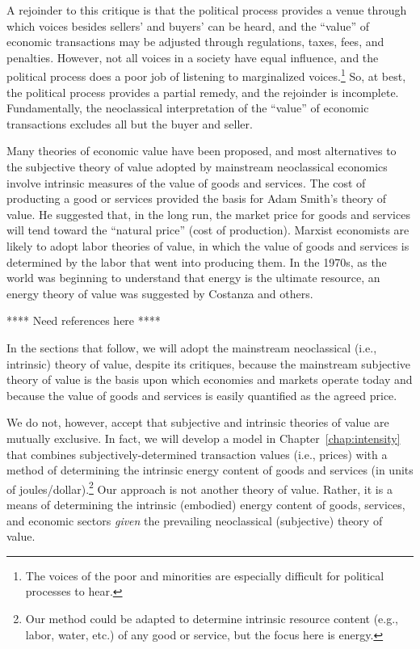 A rejoinder to this critique is that the political process
provides a venue through which voices
besides sellers' and buyers' can be heard, 
and the ``value'' of economic transactions may be 
adjusted through regulations, taxes, fees, and penalties.
However, not all voices in a society have equal influence,
and the political process does a poor job of listening to 
marginalized voices.\footnote{The voices
of the poor and minorities are especially difficult for 
political processes to hear.}
So, at best, the political process provides a partial remedy,
and the rejoinder is incomplete.
Fundamentally, the neoclassical interpretation of the ``value''
of economic transactions excludes all but the buyer and seller.

Many theories of economic value have been proposed, 
and most alternatives to the subjective theory of value
adopted by mainstream neoclassical economics involve 
intrinsic measures of the value of goods and services.
The cost of producting a good or services provided the basis for
Adam Smith's theory of value. He suggested that, in the long run,
the market price for goods and services will tend toward
the ``natural price'' (cost of production).
Marxist economists are likely to adopt labor theories of value, 
in which the value of goods and services is 
determined by the labor that went into producing them.
In the 1970s, as the world was beginning to understand that 
energy is the ultimate resource, 
an energy theory of value was suggested by Costanza and others.

**** Need references here ****

In the sections that follow, we will adopt the mainstream neoclassical
(i.e., intrinsic) theory of value, despite its critiques, 
because the mainstream subjective theory of value is 
the basis upon which economies and markets operate today
and because the value of goods and services is easily quantified
as the agreed price.

We do not, however, accept that subjective and intrinsic 
theories of value are mutually exclusive. 
In fact, we will develop a model in Chapter~\ref{chap:intensity} 
that combines subjectively-determined transaction values
(i.e., prices) with a method of determining the intrinsic energy content
of goods and services (in units of joules/dollar).\footnote{Our
method could be adapted to determine intrinsic resource content 
(e.g., labor, water, etc.) 
of any good or service, but the focus here is energy.}
Our approach is not another theory of value. 
Rather, it is a means of determining the intrinsic (embodied) 
energy content of goods, services, and economic sectors 
\emph{given} the prevailing neoclassical (subjective) theory of value.

